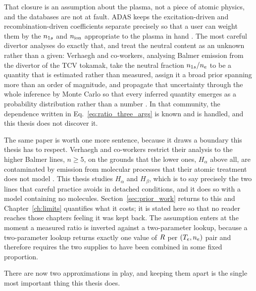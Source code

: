 That closure is an assumption about the plasma, not a piece of atomic physics,
and the databases are not at fault. ADAS keeps the excitation-driven and
recombination-driven coefficients separate precisely so that a user can weight
them by the $n_{1s}$ and $n_{\mathrm{ion}}$ appropriate to the plasma in hand
\cite{Summers2006}. The most careful
divertor analyses do exactly that, and treat the neutral content as an unknown
rather than a given: Verhaegh and co-workers, analysing Balmer emission from the
divertor of the TCV tokamak, take the neutral fraction $n_{1s}/n_e$ to be a
quantity that is estimated rather than measured, assign it a broad prior spanning
more than an order of magnitude, and propagate that uncertainty through the whole
inference by Monte Carlo so that every inferred quantity emerges as a probability
distribution rather than a number \cite{Verhaegh2019}. In that community, the
dependence written in Eq.~\eqref{eq:ratio_three_args} is known and is handled,
and this thesis does not discover it.

The same paper is worth one more sentence, because it draws a boundary this
thesis has to respect. Verhaegh and co-workers restrict their analysis to the
higher Balmer lines, $n \geq 5$, on the grounds that the lower ones, $H_\alpha$
above all, are contaminated by emission from molecular processes that their
atomic treatment does not model \cite{Verhaegh2019}. This thesis studies
$H_\alpha$ and $H_\beta$, which is to say precisely the two lines that careful
practice avoids in detached conditions, and it does so with a model containing no
molecules. Section~\ref{sec:prior_work} returns to this and
Chapter~\ref{ch:limits} quantifies what it costs; it is stated here so that no
reader reaches those chapters feeling it was kept back. The assumption enters at
the moment a measured ratio is inverted against a two-parameter lookup, because a
two-parameter lookup returns exactly one value of $R$ per $(T_e,n_e)$ pair
and therefore requires the two supplies to have been combined in some fixed
proportion.

There are now two approximations in play, and keeping them apart is the single
most important thing this thesis does.

